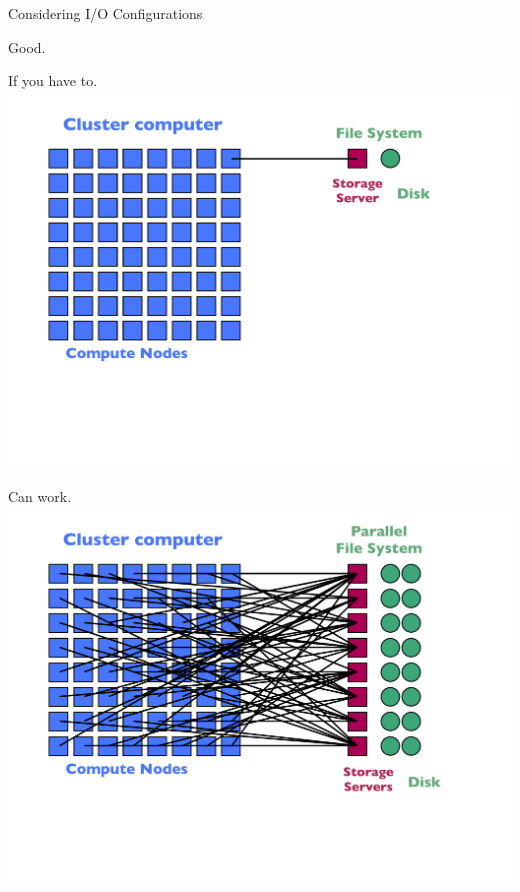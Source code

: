 \begin{frame}{Considering I/O Configurations}
\begin{minipage}{0.32\textwidth}
\begin{block}{Good.}
    \end{block}
  \end{minipage}\hspace{1ex}
  \begin{minipage}{0.32\textwidth}
    \begin{block}{If you have to.}
      \includegraphics[trim=0 120 30 40,clip,width=1\textwidth]{../common/pics/hardware/ParallelHardware15.pdf}
    \end{block}
  \end{minipage}
  \begin{minipage}{0.32\textwidth}
    \begin{block}{Can work.}
      \includegraphics[trim=0 120 30 40,clip,width=1\textwidth]{../common/pics/hardware/ParallelHardware18.pdf}

\end{block}
\end{minipage}
\end{frame}
